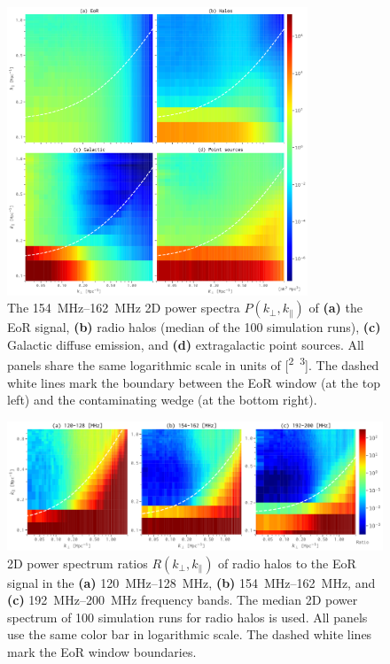 \documentclass[modern]{aastex62}
\newcommand{\klos}{\text{$k_{\parallel}$}}
\newcommand{\kperp}{\text{$k_{\bot}$}}
\begin{document}
\begin{figure}
  \centering
  \includegraphics[width=0.8\textwidth]{ps2d-band158}
  \caption{\label{fig:ps2d}%
    The \SIrange{154}{162}{\MHz} 2D power spectra $P(\kperp, \klos)$ of
    \textbf{(a)} the EoR signal,
    \textbf{(b)} radio halos (median of the 100 simulation runs),
    \textbf{(c)} Galactic diffuse emission,
    and
    \textbf{(d)} extragalactic point sources.
    All panels share the same logarithmic scale in units of
    [\si{\mK\squared\Mpc\cubed}].
    The dashed white lines mark the boundary between the EoR window
    (at the top left) and the contaminating wedge (at the bottom right).
  }
\end{figure}

\begin{figure}
  \centering
  \includegraphics[width=\textwidth]{ps2d-ratio-3bands}
  \caption{\label{fig:ps2d-ratio}%
    2D power spectrum ratios $R(\kperp, \klos)$ of radio halos to the
    EoR signal in the
    \textbf{(a)} \SIrange{120}{128}{\MHz},
    \textbf{(b)} \SIrange{154}{162}{\MHz}, and
    \textbf{(c)} \SIrange{192}{200}{\MHz} frequency bands.
    The median 2D power spectrum of 100 simulation runs for radio halos
    is used.
    All panels use the same color bar in logarithmic scale.
    The dashed white lines mark the EoR window boundaries.
  }
\end{figure}
\end{document}
